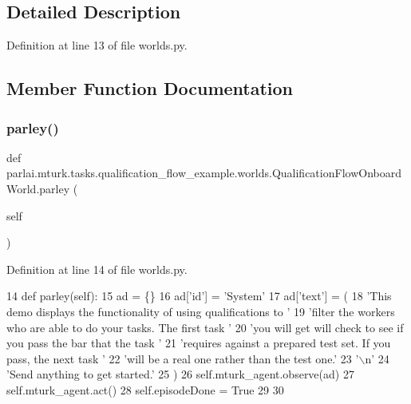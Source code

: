\subsection{Detailed Description}


Definition at line 13 of file worlds.\+py.



\subsection{Member Function Documentation}
\mbox{\label{classparlai_1_1mturk_1_1tasks_1_1qualification__flow__example_1_1worlds_1_1QualificationFlowOnboardWorld_a45e6a5c9eff2ff559ff50736f521fc50}} 
\subsubsection{\texorpdfstring{parley()}{parley()}}
{\footnotesize\ttfamily def parlai.\+mturk.\+tasks.\+qualification\+\_\+flow\+\_\+example.\+worlds.\+Qualification\+Flow\+Onboard\+World.\+parley (\begin{DoxyParamCaption}\item[{}]{self }\end{DoxyParamCaption})}



Definition at line 14 of file worlds.\+py.


\begin{DoxyCode}
14     \textcolor{keyword}{def }parley(self):
15         ad = \{\}
16         ad[\textcolor{stringliteral}{'id'}] = \textcolor{stringliteral}{'System'}
17         ad[\textcolor{stringliteral}{'text'}] = (
18             \textcolor{stringliteral}{'This demo displays the functionality of using qualifications to '}
19             \textcolor{stringliteral}{'filter the workers who are able to do your tasks. The first task '}
20             \textcolor{stringliteral}{'you will get will check to see if you pass the bar that the task '}
21             \textcolor{stringliteral}{'requires against a prepared test set. If you pass, the next task '}
22             \textcolor{stringliteral}{'will be a real one rather than the test one.'}
23             \textcolor{stringliteral}{'\(\backslash\)n'}
24             \textcolor{stringliteral}{'Send anything to get started.'}
25         )
26         self.mturk\_agent.observe(ad)
27         self.mturk\_agent.act()
28         self.episodeDone = \textcolor{keyword}{True}
29 
30 
\end{DoxyCode}


